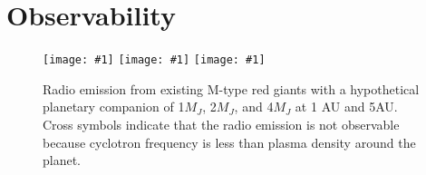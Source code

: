 \documentclass{emulateapj}
\def\plotonesc#1{\centering \leavevmode
\texttt{[image: \#1]}}
\def\plotoneh#1{\centering \leavevmode
\texttt{[image: \#1]}}
\begin{document}

\section{Observability}
\label{s:observability}


\begin{figure}[tbhp]
   \plotoneh{radio_1Mp_5AU.pdf}
   \plotoneh{radio_2Mp_4-5Gyr.pdf}
   \plotoneh{radio_4Mp_4-5Gyr.pdf}   
   \caption{Radio emission from existing M-type red giants with a hypothetical planetary companion of 1$M_J$, 2$M_J$, and 4$M_J$ at 1 AU and 5AU. Cross symbols indicate that the radio emission is not observable because cyclotron frequency is less than plasma density around the planet. }
  \label{fig:observability}
\end{figure}
\end{document}

